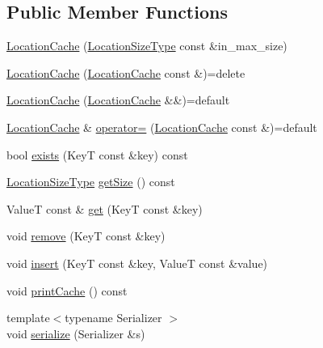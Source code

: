 \subsection*{Public Member Functions}
\begin{DoxyCompactItemize}
\item 
\hyperlink{structvt_1_1location_1_1_location_cache_a5a43f6d320c5b23dbb819e9bc74deeeb}{Location\+Cache} (\hyperlink{namespacevt_1_1location_ab1c4c5849012a23eee2fbd1fce6159d7}{Location\+Size\+Type} const \&in\+\_\+max\+\_\+size)
\item 
\hyperlink{structvt_1_1location_1_1_location_cache_a577179b586e3aa1a3d2b3c5dd6a10229}{Location\+Cache} (\hyperlink{structvt_1_1location_1_1_location_cache}{Location\+Cache} const \&)=delete
\item 
\hyperlink{structvt_1_1location_1_1_location_cache_ab6e98f027816ca0bc92d442b63160900}{Location\+Cache} (\hyperlink{structvt_1_1location_1_1_location_cache}{Location\+Cache} \&\&)=default
\item 
\hyperlink{structvt_1_1location_1_1_location_cache}{Location\+Cache} \& \hyperlink{structvt_1_1location_1_1_location_cache_a31d50fe03fe4686019333d1166d52769}{operator=} (\hyperlink{structvt_1_1location_1_1_location_cache}{Location\+Cache} const \&)=default
\item 
bool \hyperlink{structvt_1_1location_1_1_location_cache_a2e2f1c3ef1611782da77635c4181eae4}{exists} (KeyT const \&key) const
\item 
\hyperlink{namespacevt_1_1location_ab1c4c5849012a23eee2fbd1fce6159d7}{Location\+Size\+Type} \hyperlink{structvt_1_1location_1_1_location_cache_ae33d5f17b36da8b414041af55fbfac2a}{get\+Size} () const
\item 
ValueT const  \& \hyperlink{structvt_1_1location_1_1_location_cache_afb4dcce28f172b1e16567025453f22d9}{get} (KeyT const \&key)
\item 
void \hyperlink{structvt_1_1location_1_1_location_cache_ac39441e200c3c3023bda193f7075f372}{remove} (KeyT const \&key)
\item 
void \hyperlink{structvt_1_1location_1_1_location_cache_a62020ee4735da790dd652f1cfcf2583d}{insert} (KeyT const \&key, ValueT const \&value)
\item 
void \hyperlink{structvt_1_1location_1_1_location_cache_a0c8f06fd5c1ff26c30c0c25b5800ba30}{print\+Cache} () const
\item 
{\footnotesize template$<$typename Serializer $>$ }\\void \hyperlink{structvt_1_1location_1_1_location_cache_ac40038e01d47301b146869f0199d2a0a}{serialize} (Serializer \&s)
\end{DoxyCompactItemize}
